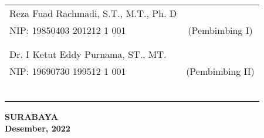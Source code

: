 \noindent
\begin{tabularx}{\textwidth}{X c}
  Reza Fuad Rachmadi, S.T., M.T., Ph. D &                 \\
  NIP: 19850403 201212 1 001            & (Pembimbing I)  \\
                                        &                 \\
                                        &                 \\
  Dr. I Ketut Eddy Purnama, ST., MT.    &                 \\
  NIP: 19690730 199512 1 001            & (Pembimbing II) \\
                                        &                 \\
                                        &                 \\
                                        &                 \\
                                        &                 \\
                                        &                 \\
                                        &                 \\
\end{tabularx}
\endgroup

\vspace{4ex}

\begin{center}
  \textbf{SURABAYA} \\
  \textbf{Desember, 2022}
\end{center}
\endgroup
